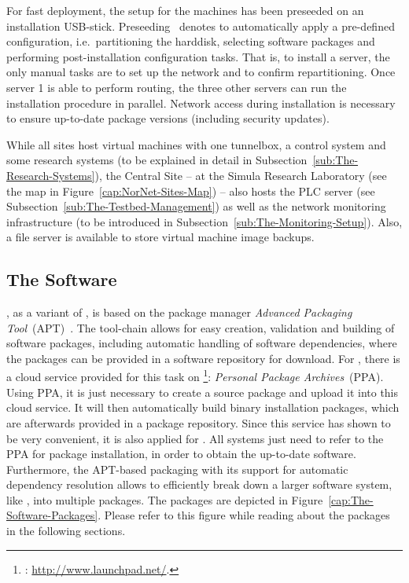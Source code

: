For fast deployment, the  setup for the machines has been preseeded on an installation USB-stick. Preseeding~\cite{UbuntuServerGuide} denotes to automatically apply a pre-defined configuration, i.e.\ partitioning the harddisk, selecting software packages and performing post-installation configuration tasks. That is, to install a server, the only manual tasks are to set up the network and to confirm repartitioning. Once server 1 is able to perform routing, the three other servers can run the installation procedure in parallel. Network access during installation is necessary to ensure up-to-date package versions (including security updates).

While all sites host virtual machines with one tunnelbox, a control system and some research systems (to be explained in detail in Subsection~\ref{sub:The-Research-Systems}), the Central Site -- at the Simula Research Laboratory (see the map in Figure~\ref{cap:NorNet-Sites-Map}) -- also hosts the PLC server (see Subsection~\ref{sub:The-Testbed-Management}) as well as the network monitoring infrastructure (to be introduced in Subsection~\ref{sub:The-Monitoring-Setup}). Also, a file server is available to store virtual machine image backups.


\subsection{The Software}
\label{sub:The-Software}


, as a variant of , is based on the package manager \emph{Advanced Packaging Tool}~(APT)~\cite{DebianDevelopersReference}. The  tool-chain allows for easy creation, validation and building of software packages, including automatic handling of software dependencies, where the packages can be provided in a software repository for download. For , there is a cloud service provided for this task on \footnote{: \url{http://www.launchpad.net/}.}: \emph{Personal Package Archives}~(PPA). Using PPA, it is just necessary to create a source package and upload it into this cloud service. It will then automatically build binary installation packages, which are afterwards provided in a package repository. Since this service has shown to be very convenient, it is also applied for . All  systems just need to refer to the PPA for package installation, in order to obtain the up-to-date  software.
Furthermore, the APT-based packaging with its support for automatic dependency resolution allows to efficiently break down a larger software system, like , into multiple packages. The  packages are depicted in Figure~\ref{cap:The-Software-Packages}. Please refer to this figure while reading about the packages in the following sections.

